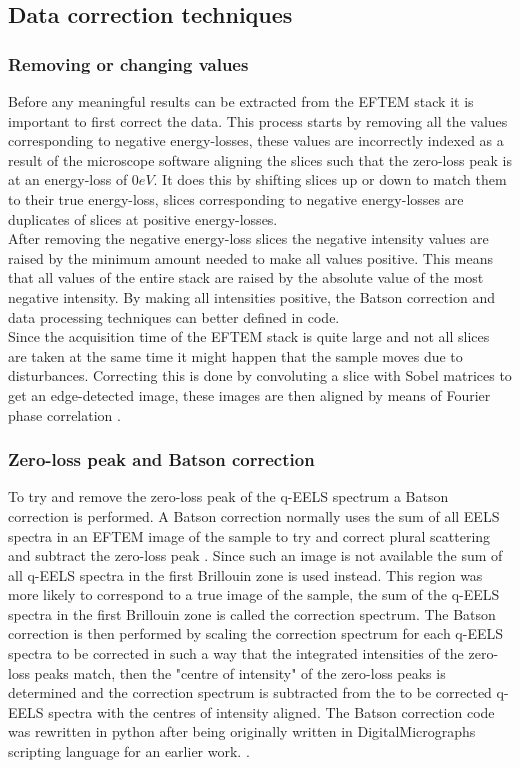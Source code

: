 \begin{multicols}{2}
\subsection{Data correction techniques}
\subsubsection{Removing or changing values}
Before any meaningful results can be extracted from the EFTEM stack it is important to first correct the data.
This process starts by removing all the values corresponding to negative energy-losses, these values are incorrectly indexed as a result of the microscope software aligning the slices such that the zero-loss peak is at an energy-loss of $0eV$.
It does this by shifting slices up or down to match them to their true energy-loss, slices corresponding to negative energy-losses are duplicates of slices at positive energy-losses.\\
After removing the negative energy-loss slices the negative intensity values are raised by the minimum amount needed to make all values positive.
This means that all values of the entire stack are raised by the absolute value of the most negative intensity. By making all intensities positive, the Batson correction and data processing techniques can better defined in code.\\
Since the acquisition time of the EFTEM stack is quite large and not all slices are taken at the same time it might happen that the sample moves due to disturbances. Correcting this is done by convoluting a slice with Sobel matrices to get an edge-detected image, these images are then aligned by means of Fourier phase correlation \cite{Sjodahl:93,SCHAFFER200427}.\\
%
\subsubsection{Zero-loss peak and Batson correction}
\label{sec:batsen}
To try and remove the zero-loss peak of the q-EELS spectrum a Batson correction is performed. A Batson correction normally uses the sum of all EELS spectra in an EFTEM image of the sample to try and correct plural scattering and subtract the zero-loss peak \cite{PhysRevB.27.5224}. Since such an image is not available the sum of all q-EELS spectra in the first Brillouin zone is used instead. This region was more likely to correspond to a true image of the sample, the sum of the q-EELS spectra in the first Brillouin zone is called the correction spectrum.
The Batson correction is then performed by scaling the correction spectrum for each q-EELS spectra to be corrected in such a way that the integrated intensities of the zero-loss peaks match, then the "centre of intensity" of the zero-loss peaks is determined and the correction spectrum is subtracted from the to be corrected q-EELS spectra with the centres of intensity aligned.
The Batson correction code was rewritten in python after being originally written in DigitalMicrographs scripting language for an earlier work. \cite{Politano2017}.\\


\end{multicols}
